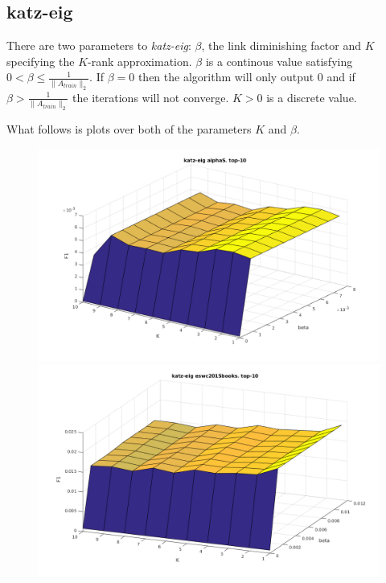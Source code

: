 
\subsection{katz-eig}\label{sec:param:katzeig}

There are two parameters to \textit{katz-eig}: $\beta$, the link diminishing factor and $K$ specifying the $K$-rank approximation. $\beta$ is a continous value satisfying $0 < \beta \leq \frac{1}{\|A_{train}\|_2}$. If $\beta = 0$ then the algorithm will only output 0 and if $\beta > \frac{1}{\|A_{train}\|_2}$ the iterations will not converge. $K > 0$ is a discrete value.

What follows is plots over both of the parameters $K$ and $\beta$.

\begin{figure}[h!]
\centering
\begin{minipage}{.5\textwidth}
    \centering
    \includegraphics[width=\linewidth]{fig/katzeig_beta_k/alphaS_katzeig.png}
\end{minipage}%
\begin{minipage}{.5\textwidth}
    \centering
    \includegraphics[width=\linewidth]{fig/katzeig_beta_k/eswc2015books_katzeig.png}
\end{minipage}
\end{figure}

